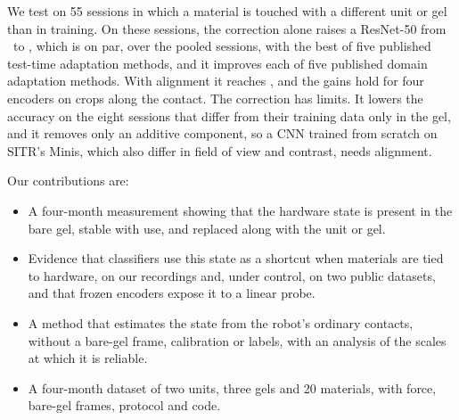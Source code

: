 We test on 55 sessions in which a material is touched with a different unit or gel than in training. On these sessions, the correction alone raises a ResNet-50 from \XpRecipeAcc\ to \XpReadAcc\pct, which is on par, over the pooled sessions, with the best of five published test-time adaptation methods, and it improves each of five published domain adaptation methods. With alignment it reaches \XpFullAcc\pct, and the gains hold for four encoders on crops along the contact. The correction has limits. It lowers the accuracy on the eight sessions that differ from their training data only in the gel, and it removes only an additive component, so a CNN trained from scratch on SITR's Minis, which also differ in field of view and contrast, needs alignment.

Our contributions are:
\begin{itemize}\setlength{\itemsep}{1pt}
  \item A four-month measurement showing that the hardware state is present in the bare gel, stable with use, and replaced along with the unit or gel.
  \item Evidence that classifiers use this state as a shortcut when materials are tied to hardware, on our recordings and, under control, on two public datasets, and that frozen encoders expose it to a linear probe.
  \item A method that estimates the state from the robot's ordinary contacts, without a bare-gel frame, calibration or labels, with an analysis of the scales at which it is reliable.
  \item A four-month dataset of two units, three gels and 20 materials, with force, bare-gel frames, protocol and code.
\end{itemize}
